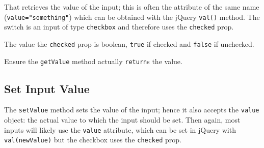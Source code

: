 \documentclass[
]{krantz}
\makeatletter
\newenvironment{Shaded}{\begin{snugshade}}{\end{snugshade}}
\newcommand{\AttributeTok}[1]{\textcolor[rgb]{0.61,0.61,0.61}{#1}}
\newcommand{\CommentTok}[1]{\textcolor[rgb]{0.37,0.37,0.37}{\textit{#1}}}
\newcommand{\ControlFlowTok}[1]{\textcolor[rgb]{0.27,0.27,0.27}{\textbf{#1}}}
\newcommand{\DataTypeTok}[1]{\textcolor[rgb]{0.27,0.27,0.27}{#1}}
\newcommand{\KeywordTok}[1]{\textcolor[rgb]{0.27,0.27,0.27}{\textbf{#1}}}
\newcommand{\NormalTok}[1]{#1}
\newcommand{\OperatorTok}[1]{\textcolor[rgb]{0.43,0.43,0.43}{\textbf{#1}}}
\newcommand{\StringTok}[1]{\textcolor[rgb]{0.5,0.5,0.5}{#1}}
\newcommand{\VariableTok}[1]{\textcolor[rgb]{0,0,0}{#1}}
\newenvironment{kframe}{%
\medskip{}
\setlength{\fboxsep}{.8em}
 \def\at@end@of@kframe{}%
 \ifinner\ifhmode%
  \def\at@end@of@kframe{\end{minipage}}%
  \begin{minipage}{\columnwidth}%
 \fi\fi%
 \def\FrameCommand##1{\hskip\@totalleftmargin \hskip-\fboxsep
 \colorbox{shadecolor}{##1}\hskip-\fboxsep
     \hskip-\linewidth \hskip-\@totalleftmargin \hskip\columnwidth}%
 \MakeFramed {\advance\hsize-\width
   \@totalleftmargin\z@ \linewidth\hsize
   \@setminipage}}%
 {\par\unskip\endMakeFramed%
 \at@end@of@kframe}
\renewenvironment{Shaded}{\begin{kframe}}{\end{kframe}}
\newenvironment{rmdblock}[1]
  {
  \begin{itemize}
  \renewcommand{\labelitemi}{
    \raisebox{-.7\height}[0pt][0pt]{
      {\setkeys{Gin}{width=3em,keepaspectratio}\texttt{[image: images/\#1]}}
    }
  }
  \setlength{\fboxsep}{1em}
  \begin{kframe}
  \item
  }
  {
  \end{kframe}
  \end{itemize}
  }
\newenvironment{rmdnote}
  {\begin{rmdblock}{note}}
  {\end{rmdblock}}
\makeatother
\begin{document}
That retrieves the value of the input; this is often the attribute of the same name (\texttt{value="something"}) which can be obtained with the jQuery \texttt{val()} method. The switch is an input of type \texttt{checkbox} and therefore uses the \texttt{checked} prop.

\begin{Shaded}
\end{Shaded}

The value the \texttt{checked} prop is boolean, \texttt{true} if checked and \texttt{false} if unchecked.

\begin{rmdnote}
Ensure the \texttt{getValue} method actually \texttt{return}s the value.
\end{rmdnote}

\hypertarget{shiny-input-set-value}{%
\subsection{Set Input Value}\label{shiny-input-set-value}}

The \texttt{setValue} method sets the value of the input; hence it also accepts the \texttt{value} object: the actual value to which the input should be set. Then again, most inputs will likely use the \texttt{value} attribute, which can be set in jQuery with \texttt{val(newValue)} but the checkbox uses the \texttt{checked} prop.
\end{document}

